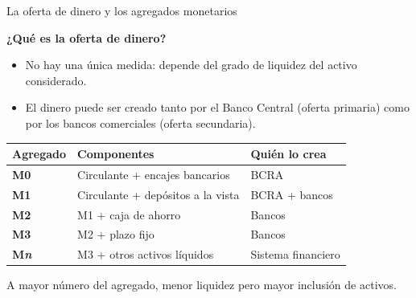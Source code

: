 \documentclass{beamer}
\begin{document}
\begin{frame}{La oferta de dinero y los agregados monetarios}
    \small
    \begin{block}{\textbf{¿Qué es la oferta de dinero?}}
    \begin{itemize}
        \item No hay una única medida: depende del grado de liquidez del activo considerado.
        \item El dinero puede ser creado tanto por el Banco Central (\alert{oferta primaria}) como por los bancos comerciales (\alert{oferta secundaria}).
    \end{itemize}
    \end{block}
    \vspace{0.3em}
    \begin{center}
    \small
    \setlength{\tabcolsep}{3.5pt}
    \begin{tabular}{@{}l p{} p{}@{}}
    \toprule
    \textbf{Agregado} & \textbf{Componentes} & \textbf{Quién lo crea} \\
    \midrule
    \textbf{M0}  & Circulante + encajes bancarios         & BCRA \\
    \textbf{M1}  & Circulante + depósitos a la vista      & BCRA + bancos \\
    \textbf{M2}  & M1 + caja de ahorro                    & Bancos \\
    \textbf{M3}  & M2 + plazo fijo                        & Bancos \\
    \textbf{M\textit{n}} & M3 + otros activos líquidos        & Sistema financiero \\
    \bottomrule
    \end{tabular}
    \end{center}
    \vspace{0.5em}
    \footnotesize
    A mayor número del agregado, menor liquidez pero mayor inclusión de activos.
\end{frame}
\end{document}

